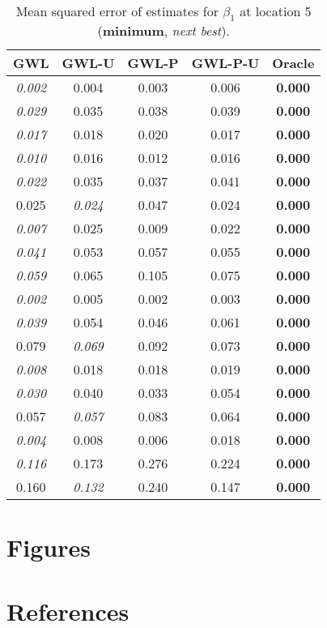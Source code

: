 \documentclass[authoryear, review, 11pt]{elsarticle}
\begin{document}
\begin{table}[ht]
\begin{center}
\begin{tabular}{ccccc}
 GWL & GWL-U & GWL-P & GWL-P-U & Oracle \\ 
  \hline
\emph{0.002} & 0.004 & 0.003 & 0.006 & \textbf{0.000} \\ 
  \emph{0.029} & 0.035 & 0.038 & 0.039 & \textbf{0.000} \\ 
  \emph{0.017} & 0.018 & 0.020 & 0.017 & \textbf{0.000} \\ 
  \emph{0.010} & 0.016 & 0.012 & 0.016 & \textbf{0.000} \\ 
  \emph{0.022} & 0.035 & 0.037 & 0.041 & \textbf{0.000} \\ 
  0.025 & \emph{0.024} & 0.047 & 0.024 & \textbf{0.000} \\ 
  \emph{0.007} & 0.025 & 0.009 & 0.022 & \textbf{0.000} \\ 
  \emph{0.041} & 0.053 & 0.057 & 0.055 & \textbf{0.000} \\ 
  \emph{0.059} & 0.065 & 0.105 & 0.075 & \textbf{0.000} \\ 
  \emph{0.002} & 0.005 & 0.002 & 0.003 & \textbf{0.000} \\ 
  \emph{0.039} & 0.054 & 0.046 & 0.061 & \textbf{0.000} \\ 
  0.079 & \emph{0.069} & 0.092 & 0.073 & \textbf{0.000} \\ 
  \emph{0.008} & 0.018 & 0.018 & 0.019 & \textbf{0.000} \\ 
  \emph{0.030} & 0.040 & 0.033 & 0.054 & \textbf{0.000} \\ 
  0.057 & \emph{0.057} & 0.083 & 0.064 & \textbf{0.000} \\ 
  \emph{0.004} & 0.008 & 0.006 & 0.018 & \textbf{0.000} \\ 
  \emph{0.116} & 0.173 & 0.276 & 0.224 & \textbf{0.000} \\ 
  0.160 & \emph{0.132} & 0.240 & 0.147 & \textbf{0.000} \\ 
  \end{tabular}
\caption{Mean squared error of estimates for $\beta_1$ at location 5 (\textbf{minimum}, \emph{next best}).\label{MSEX-nonzero}}
\end{center}
\end{table}






\section{Figures}






\section{References}


\end{document}
